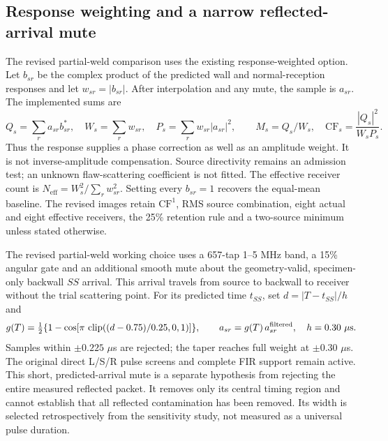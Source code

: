 \subsection{Response weighting and a narrow reflected-arrival mute}
The revised partial-weld comparison uses the existing response-weighted option. Let $b_{sr}$ be the complex product of the predicted wall and normal-reception responses and let $w_{sr}=|b_{sr}|$. After interpolation and any mute, the sample is $a_{sr}$. The implemented sums are
\begin{equation}
 Q_s=\sum_r a_{sr}b_{sr}^{*},\quad W_s=\sum_r w_{sr},\quad
 P_s=\sum_r w_{sr}|a_{sr}|^2,\qquad
 M_s=Q_s/W_s,\quad \mathrm{CF}_s=\frac{|Q_s|^2}{W_sP_s}.
\label{saftapp:weighted}
\end{equation}
Thus the response supplies a phase correction as well as an amplitude weight. It is not inverse-amplitude compensation. Source directivity remains an admission test; an unknown flaw-scattering coefficient is not fitted. The effective receiver count is $N_{\mathrm{eff}}=W_s^2/\sum_r w_{sr}^2$. Setting every $b_{sr}=1$ recovers the equal-mean baseline. The revised images retain $\mathrm{CF}^1$, RMS source combination, eight actual and eight effective receivers, the 25\% retention rule and a two-source minimum unless stated otherwise.

The revised partial-weld working choice uses a 657-tap 1--5 MHz band, a 15\% angular gate and an additional smooth mute about the geometry-valid, specimen-only backwall $SS$ arrival. This arrival travels from source to backwall to receiver without the trial scattering point. For its predicted time $t_{SS}$, set $d=|T-t_{SS}|/h$ and
\begin{equation}
 g(T)=\tfrac12\{1-\cos[\pi\,\operatorname{clip}((d-0.75)/0.25,0,1)]\},
 \qquad a_{sr}=g(T)\,a_{sr}^{\rm filtered},\quad h=0.30\ \mu\mathrm{s}.
\label{saftapp:mute}
\end{equation}
Samples within $\pm0.225$ $\mu$s are rejected; the taper reaches full weight at $\pm0.30$ $\mu$s. The original direct L/S/R pulse screens and complete FIR support remain active. This short, predicted-arrival mute is a separate hypothesis from rejecting the entire measured reflected packet. It removes only its central timing region and cannot establish that all reflected contamination has been removed. Its width is selected retrospectively from the sensitivity study, not measured as a universal pulse duration.

